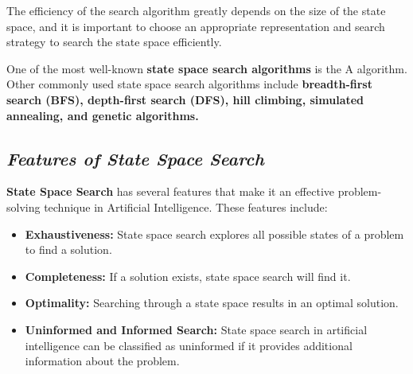 \documentclass{article}
\begin{document}
The efficiency of the search algorithm greatly depends on the size of the state space, and it is important
to choose an appropriate representation and search strategy to search the state space efficiently.

One of the most well-known \textbf{state space search algorithms} is the A algorithm. Other commonly
used state space search algorithms include \textbf{breadth-first search (BFS), depth-first search (DFS), hill
climbing, simulated annealing, and genetic algorithms.}
\subsection{\textbf{\textit{Features of State Space Search}}}
\textbf{State Space Search} has several features that make it an effective problem-solving technique in Artificial
Intelligence. These features include:
\begin{itemize}
    \item \textbf{Exhaustiveness:} State space search explores all possible states of a problem to find a solution.
    \item \textbf{Completeness:} If a solution exists, state space search will find it.
    \item \textbf{Optimality:} Searching through a state space results in an optimal solution.
    \item \textbf{Uninformed and Informed Search:} State space search in artificial intelligence can be classified as
    uninformed if it provides additional information about the problem.
\end{itemize}
\end{document}
